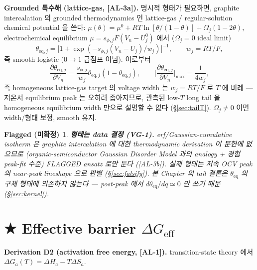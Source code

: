 \documentclass[11pt,a4paper]{article}
\newtheorem*{flagbox}{Flagged (미확정)}
\newcommand{\eff}{\mathrm{eff}}
\newcommand{\eq}{\mathrm{eq}}
\newcommand{\AL}[1]{\textsf{[AL-#1]}}
\begin{document}
\textbf{Grounded 특수해 (lattice-gas, \AL{3a}).} 명시적 형태가 필요하면, graphite
intercalation 의 grounded thermodynamics 인 lattice-gas / regular-solution chemical
potential \cite{mckinnon1983,bazant2013} 을 쓴다: $\mu(\theta)=\mu^0+RT\ln[\theta/(1-\theta)]
+\Omega_j(1-2\theta)$, electrochemical equilibrium $\mu=s_{\phi,j}F(V_n-U_j^0)$ 에서
($\Omega_j=0$ ideal limit)
\begin{equation}
\theta_{\eq,j}=\big[1+\exp(-s_{\phi,j}(V_n-U_j)/w_j)\big]^{-1},\qquad w_j=RT/F,
\label{eq:latticegas}
\end{equation}
즉 smooth logistic ($0\!\to\!1$ 급점프 아님). 이로부터
\begin{equation}
\frac{\partial\theta_{\eq,j}}{\partial V_n}=\frac{s_{\phi,j}}{w_j}\theta_{\eq,j}(1-\theta_{\eq,j}),
\qquad
\Big|\frac{\partial\theta_{\eq,j}}{\partial V_n}\Big|_{\max}=\frac1{4w_j},
\label{eq:thetaeq_derivative}
\end{equation}
즉 homogeneous lattice-gas target 의 voltage width 는 $w_j=RT/F$ 로 $T$ 에 비례 — 저온서
equilibrium peak 는 오히려 좁아지므로, 관측된 low-$T$ long tail 을 homogeneous equilibrium
width 만으로 설명할 수 없다 (\S\ref{sec:tailT}). $\Omega_j\ne0$ 이면 width/형태 보정, smooth
유지.
\begin{flagbox}
\textbf{형태는 data 결정 (VG-1).} erf/Gaussian-cumulative isotherm 은 graphite
intercalation 에 대한 thermodynamic derivation 이 문헌에 없으므로 (organic-semiconductor
Gaussian Disorder Model \cite{baessler1993} 과의 analogy + 경험 peak-fit 수준) FLAGGED
ansatz 로만 둔다 (\AL{3b}). 실제 형태는 저속 OCV peak 의 near-peak lineshape 으로 판별
(\S\ref{sec:falsify}). 본 Chapter 의 tail 결론은 $\theta_\eq$ 의 \emph{구체 형태에
의존하지 않는다} — post-peak 에서 $d\theta_\eq/dq\simeq0$ 만 쓰기 때문 (\S\ref{sec:kernel}).
\end{flagbox}

\section{★ Effective barrier $\Delta G_\eff$}\label{sec:barrier}
\textbf{Derivation D2 (activation free energy, \AL{1}).} transition-state theory
\cite{eyring1935,eyringchemrev1935} 에서 $\Delta G_a(T)=\Delta H_a-T\Delta S_a$.
\end{document}
